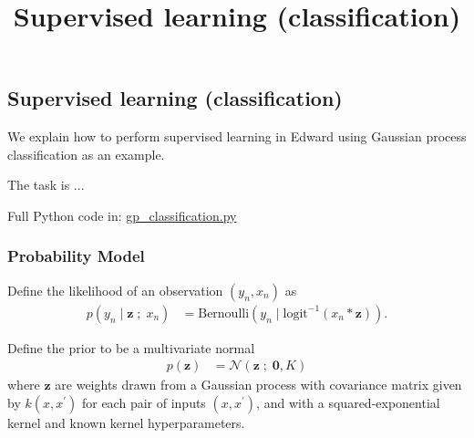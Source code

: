 \title{Supervised learning (classification)}

\subsection{Supervised learning (classification)}

We explain how to perform supervised learning in Edward using
Gaussian process classification as an example.

The task is ...


Full Python code in:
\href{https://github.com/blei-lab/edward/blob/master/examples/gp_classification.py}
{gp_classification.py}


\subsubsection{Probability Model}
Define the likelihood of an observation $(y_n, x_n)$ as
\begin{align*}
  p(y_n \mid \mathbf{z} \;;\; x_n)
  &=
  \text{Bernoulli}(y_n \mid \text{logit}^{-1}(x_n * \mathbf{z})).
\end{align*}

Define the prior to be a multivariate normal
\begin{align*}
  p(\mathbf{z})
  &=
  \mathcal{N}(\mathbf{z} \;;\; \mathbf{0}, K)
\end{align*}
 where $\mathbf{z}$ are weights drawn from a Gaussian process with covariance
 matrix
 given by $k(x, x^\prime)$ for each pair of inputs $(x, x^\prime)$, and with a
 squared-exponential kernel and known kernel hyperparameters.

